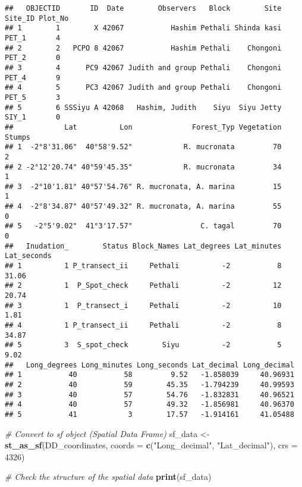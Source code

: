 \documentclass[
]{article}
\newenvironment{Shaded}{\begin{snugshade}}{\end{snugshade}}
\newcommand{\AttributeTok}[1]{\textcolor[rgb]{0.13,0.29,0.53}{#1}}
\newcommand{\CommentTok}[1]{\textcolor[rgb]{0.56,0.35,0.01}{\textit{#1}}}
\newcommand{\DecValTok}[1]{\textcolor[rgb]{0.00,0.00,0.81}{#1}}
\newcommand{\FunctionTok}[1]{\textcolor[rgb]{0.13,0.29,0.53}{\textbf{#1}}}
\newcommand{\NormalTok}[1]{#1}
\newcommand{\OtherTok}[1]{\textcolor[rgb]{0.56,0.35,0.01}{#1}}
\newcommand{\StringTok}[1]{\textcolor[rgb]{0.31,0.60,0.02}{#1}}
\begin{document}
\begin{verbatim}
##   OBJECTID       ID  Date        Observers   Block        Site Site_ID Plot_No
## 1        1        X 42067           Hashim Pethali Shinda kasi   PET_1       4
## 2        2   PCPO 8 42067           Hashim Pethali    Chongoni   PET_2       0
## 3        4      PC9 42067 Judith and group Pethali    Chongoni   PET_4       9
## 4        5      PC3 42067 Judith and group Pethali    Chongoni   PET_5       3
## 5        6 SSSiyu A 42068   Hashim, Judith    Siyu  Siyu Jetty   SIY_1       0
##            Lat          Lon              Forest_Typ Vegetation Stumps
## 1  -2°8'31.06"  40°58'9.52"            R. mucronata         70      2
## 2 -2°12'20.74" 40°59'45.35"            R. mucronata         34      1
## 3  -2°10'1.81" 40°57'54.76" R. mucronata, A. marina         15      1
## 4  -2°8'34.87" 40°57'49.32" R. mucronata, A. marina         55      0
## 5   -2°5'9.02"  41°3'17.57"                C. tagal         70      0
##   Inudation_        Status Block_Names Lat_degrees Lat_minutes Lat_seconds
## 1          1 P_transect_ii     Pethali          -2           8       31.06
## 2          1  P_Spot_check     Pethali          -2          12       20.74
## 3          1  P_transect_i     Pethali          -2          10        1.81
## 4          1 P_transect_ii     Pethali          -2           8       34.87
## 5          3  S_spot_check        Siyu          -2           5        9.02
##   Long_degrees Long_minutes Long_seconds Lat_decimal Long_decimal
## 1           40           58         9.52   -1.858039     40.96931
## 2           40           59        45.35   -1.794239     40.99593
## 3           40           57        54.76   -1.832831     40.96521
## 4           40           57        49.32   -1.856981     40.96370
## 5           41            3        17.57   -1.914161     41.05488
\end{verbatim}

\begin{Shaded}
\begin{Highlighting}[]
\CommentTok{\# Convert to sf object (Spatial Data Frame)}
\NormalTok{sf\_data }\OtherTok{\textless{}{-}} \FunctionTok{st\_as\_sf}\NormalTok{(DD\_coordinates, }\AttributeTok{coords =} \FunctionTok{c}\NormalTok{(}\StringTok{"Long\_decimal"}\NormalTok{, }\StringTok{"Lat\_decimal"}\NormalTok{), }\AttributeTok{crs =} \DecValTok{4326}\NormalTok{)}


\CommentTok{\# Check the structure of the spatial data}
\FunctionTok{print}\NormalTok{(sf\_data)}
\end{Highlighting}
\end{Shaded}
\end{document}
